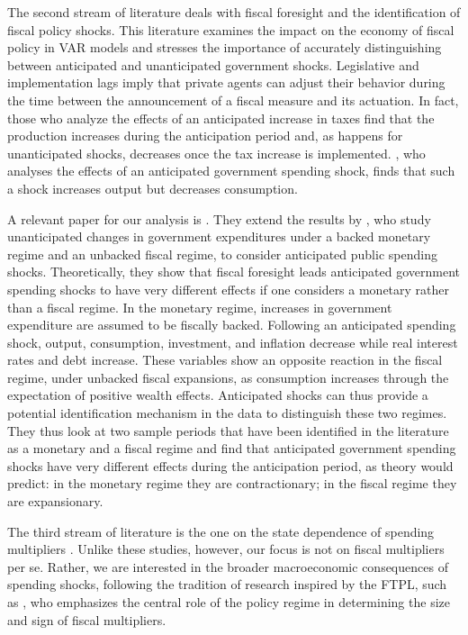 \documentclass[12pt]{article}%
\theoremstyle{remark}
\begin{document}
The second stream of literature deals with fiscal foresight and the identification of fiscal policy shocks. This literature examines the impact on the economy of fiscal policy in VAR models \citep[e.g., see][]{ BP,Ramey2011,AuGoro2012,ForniGambetti2016,RameyShapiro,MERTENS2011,MertensRavn2012,BenZeev2017,Fisher} and stresses the importance of accurately distinguishing between anticipated and unanticipated government shocks. Legislative and implementation lags imply that private agents can adjust their behavior during the time between the announcement of a fiscal measure and its actuation. In fact, those who analyze the effects of an anticipated increase in taxes \citep[see][]{MertensRavn2012,MERTENS2011} find that the production increases during the anticipation period and, as happens for unanticipated shocks, decreases once the tax increase is implemented. \cite{Ramey2011}, who analyses the effects of an anticipated government spending shock, finds that such a shock increases output but decreases consumption. 

A relevant paper for our analysis is \cite{ASCARI20231}. They extend the results by \citet{Beck}, who study unanticipated changes in government expenditures under a backed monetary regime and an unbacked fiscal regime, to consider anticipated public spending shocks. 
Theoretically, they show that fiscal foresight leads anticipated government spending shocks to have very different effects if one considers a monetary rather than a fiscal regime. In the monetary regime, increases in government expenditure are assumed to be fiscally backed. Following an anticipated spending shock, output, consumption, investment, and inflation decrease while real interest rates and debt increase. These variables show an opposite reaction in the fiscal regime, under unbacked fiscal expansions, as consumption increases through the expectation of positive wealth effects.
Anticipated shocks can thus provide a potential identification mechanism in the data to distinguish these two regimes. They thus look at two sample periods that have been identified in the literature as a monetary and a fiscal regime and find that anticipated government spending shocks have very different effects during the anticipation period, as theory would predict: in the monetary regime they are contractionary;
in the fiscal regime they are expansionary. 

The third stream of literature is the one on the state dependence of spending multipliers \citep[see][]{AuGoro2012, RameyZuba2018, Caggianoetal2015EJ}. Unlike these studies, however, our focus is not on fiscal multipliers per se. Rather, we are interested in the broader macroeconomic consequences of spending shocks, following the tradition of research inspired by the FTPL, such as \cite{LeeperTraumWalker:2017}, who emphasizes the central role of the policy regime in determining the size and sign of fiscal multipliers. 
\end{document}
